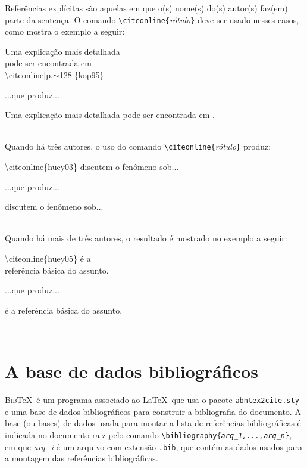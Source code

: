 Referências explícitas são aquelas em que o(s) nome(s) do(s) autor(s)  
faz(em) parte da sentença. O comando \verb|\citeonline{|\emph{rótulo}\verb|}|
deve ser usado nesses casos, como mostra o exemplo a seguir:\\[6pt]
	{\parbox[t]{5.5cm}{%
	\ttfamily\footnotesize
	Uma explicação mais detalhada\\ 
	pode ser encontrada em\\ 
	\textbackslash{}citeonline[p.$\sim$128]\{kop95\}.}}
\hspace{1em} ...que produz...\hspace{1em}
	{\parbox[t]{6.5cm}{%
	\footnotesize Uma explicação mais detalhada pode
	ser encontrada em  
	.}}\\[12pt]
Quando há três autores, o uso do comando 
\verb|\citeonline{|\emph{rótulo}\verb|}| produz:\\[6pt]
	{\parbox[t]{5.5cm}{%
	\ttfamily\footnotesize
	\textbackslash{}citeonline\{huey03\}
	discutem o fenômeno sob...}}
\hspace{1em} ...que produz...\hspace{1em}
	{\parbox[t]{6.5cm}{%
	\footnotesize 
	discutem o fenômeno sob...}}\\[12pt]
Quando há mais de três autores, o resultado é mostrado no exemplo
a seguir:\\[6pt]
	{\parbox[t]{5.5cm}{%
	\ttfamily\footnotesize
	\textbackslash{}citeonline\{huey05\}
	é a\\ referência básica do assunto.}}
\hspace{1em} ...que produz...\hspace{1em}
	{\parbox[t]{6.5cm}{%
	\footnotesize 
	é a referência básica do assunto.}}\\[12pt]

\section{A base de dados bibliográficos}

\textsc{Bib}\TeX\ é um programa associado ao \LaTeX\ que usa o pacote \texttt{abntex2cite.sty} e uma base de dados bibliográficos para
construir a bibliografia do documento. A base (ou bases) de dados usada para 
montar a lista de referências bibliográficas é indicada no documento
raiz pelo comando 
\texttt{\textbackslash{}bibliography\{\textrm{\emph{arq\_1,...,arq\_n}}\}},
em que \emph{arq\_i} é um arquivo com extensão \texttt{.bib}, que contém
as dados usados para a montagem das referências bibliográficas. 

